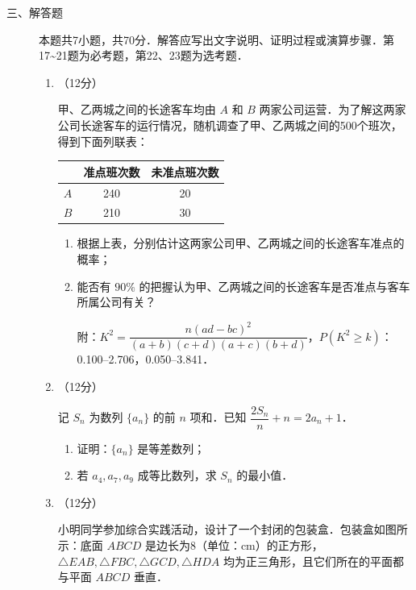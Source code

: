 \begin{description}
    \item[三、解答题] 本题共7小题，共70分．解答应写出文字说明、证明过程或演算步骤．第17\textasciitilde21题为必考题，第22、23题为选考题．
    \begin{enumerate}[leftmargin=5pt]
      \addtocounter{enumi}{+16}
        \item （12分）

        甲、乙两城之间的长途客车均由 $A$ 和 $B$ 两家公司运营．为了解这两家公司长途客车的运行情况，随机调查了甲、乙两城之间的500个班次，得到下面列联表：

        {\centering\begin{tabular}{c|c|c}
        \hline
        & 准点班次数 & 未准点班次数 \\
        \hline
        $A$ & 240 & 20 \\
        \hline
        $B$ & 210 & 30 \\
        \hline
        \end{tabular}\par}

        \begin{enumerate}[label=(\arabic*)]
            \item 根据上表，分别估计这两家公司甲、乙两城之间的长途客车准点的概率；
            \item 能否有 $90\%$ 的把握认为甲、乙两城之间的长途客车是否准点与客车所属公司有关？

            附：$K^2=\dfrac{n(ad-bc)^2}{(a+b)(c+d)(a+c)(b+d)}$，$P(K^2\geqslant k)$：0.100--2.706，0.050--3.841．
        \end{enumerate}

        \item （12分）

        记 $S_n$ 为数列 $\{a_n\}$ 的前 $n$ 项和．已知 $\dfrac{2S_n}{n}+n=2a_n+1$．

        \begin{enumerate}[label=(\arabic*)]
            \item 证明：$\{a_n\}$ 是等差数列；
            \item 若 $a_4,a_7,a_9$ 成等比数列，求 $S_n$ 的最小值．
        \end{enumerate}

        \item （12分）

        小明同学参加综合实践活动，设计了一个封闭的包装盒．包装盒如图所示：底面 $ABCD$ 是边长为8（单位：cm）的正方形，$\triangle EAB,\triangle FBC,\triangle GCD,\triangle HDA$ 均为正三角形，且它们所在的平面都与平面 $ABCD$ 垂直．


\end{enumerate}
\end{description}
